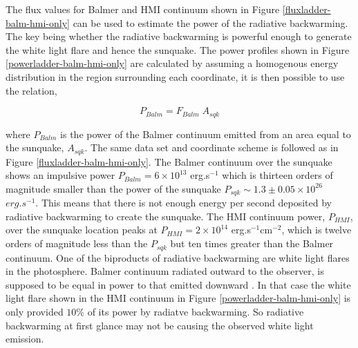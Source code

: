 The flux values for Balmer and HMI continuum shown in Figure \ref{fluxladder-balm-hmi-only} can be used to estimate the power of the radiative backwarming. The key being whether the radiative backwarming is powerful enough to generate the white light flare and hence the sunquake. The power profiles shown in Figure \ref{powerladder-balm-hmi-only} are calculated by assuming a homogenous energy distribution in the region surrounding each coordinate, it is then possible to use the relation,

\begin{equation}
P_{Balm} = F_{Balm} \; A_{sqk}  
\end{equation}\label{Pbalm}

where $P_{Balm}$ is the power of the Balmer continuum emitted from an area equal to the sunquake, $A_{sqk}$. The same data set and coordinate scheme is followed as in Figure \ref{fluxladder-balm-hmi-only}. The Balmer continuum over the sunquake shows an impulsive power $P_{Balm} = 6{\times}10^{13}$ erg.s$^{-1}$ which is thirteen orders of magnitude smaller than the power of the sunquake $P_{sqk} \sim 1.3\pm0.05{\times}10^{26}$ $erg.s^{-1}$. This means that there is not enough energy per second deposited by radiative backwarming to create the sunquake. The HMI continuum power, $P_{HMI}$, over the sunquake location peaks at $P_{HMI} = 2{\times}10^{14}$ erg.s$^{-1}$cm$^{-2}$, which is twelve orders of magnitude less than the $P_{sqk}$ but ten times greater than the Balmer continuum. One of the biproducts of radiative backwarming are white light flares in the photosphere. Balmer continuum radiated outward to the observer, is supposed to be equal in power to that emitted downward \citep{1989SoPh..124..303M}. In that case the white light flare shown in the HMI continuum in Figure \ref{powerladder-balm-hmi-only} is only provided $10\%$ of its power by radiatve backwarming. So radiative backwarming at first glance may not be causing the observed white light emission.

